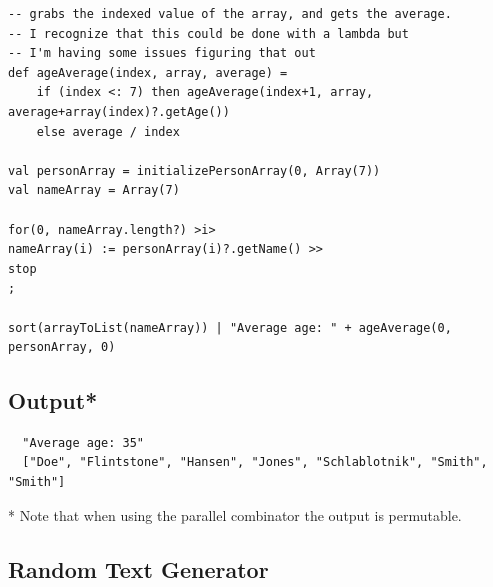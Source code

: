 \documentclass[12pt, letterpaper]{article}
\begin{document}
\begin{lstlisting}
-- grabs the indexed value of the array, and gets the average.
-- I recognize that this could be done with a lambda but
-- I'm having some issues figuring that out
def ageAverage(index, array, average) =
    if (index <: 7) then ageAverage(index+1, array, average+array(index)?.getAge())
    else average / index

val personArray = initializePersonArray(0, Array(7))
val nameArray = Array(7)

for(0, nameArray.length?) >i>
nameArray(i) := personArray(i)?.getName() >>
stop
;

sort(arrayToList(nameArray)) | "Average age: " + ageAverage(0, personArray, 0)

\end{lstlisting}

\subsection*{Output*}

\begin{lstlisting}
  "Average age: 35"
  ["Doe", "Flintstone", "Hansen", "Jones", "Schlablotnik", "Smith", "Smith"]
\end{lstlisting}

* Note that when using the parallel combinator the output is permutable.

\newpage

\subsection*{Random Text Generator}
\end{document}
